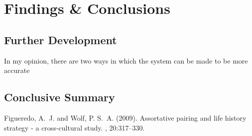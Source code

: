 \documentclass[12pt]{article} %
\begin{document}
\section{Findings & Conclusions}
\subsection{Further Development}
In my opinion, there are two ways in which the system can be made to be more accurate
\subsection{Conclusive Summary}


\begin{thebibliography}{99} %

Figueredo, A.~J. and Wolf, P. S.~A. (2009).
\newblock Assortative pairing and life history strategy - a cross-cultural
  study.
, 20:317--330.
 
\end{thebibliography}

\end{document}
